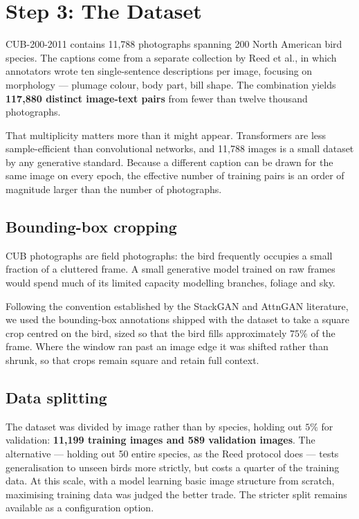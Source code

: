 \documentclass[11pt,a4paper]{article}
\newcommand{\step}[1]{\section{#1}}
\begin{document}
\step{Step 3: The Dataset}

CUB-200-2011 contains 11{,}788 photographs spanning 200 North American bird
species. The captions come from a separate collection by Reed et al., in which
annotators wrote ten single-sentence descriptions per image, focusing on
morphology --- plumage colour, body part, bill shape. The combination yields
\textbf{117{,}880 distinct image-text pairs} from fewer than twelve thousand
photographs.

That multiplicity matters more than it might appear. Transformers are less
sample-efficient than convolutional networks, and 11{,}788 images is a small
dataset by any generative standard. Because a different caption can be drawn for
the same image on every epoch, the effective number of training pairs is an
order of magnitude larger than the number of photographs.

\subsection{Bounding-box cropping}

CUB photographs are field photographs: the bird frequently occupies a small
fraction of a cluttered frame. A small generative model trained on raw frames
would spend much of its limited capacity modelling branches, foliage and sky.

Following the convention established by the StackGAN and AttnGAN literature, we
used the bounding-box annotations shipped with the dataset to take a square crop
centred on the bird, sized so that the bird fills approximately $75\%$ of the
frame. Where the window ran past an image edge it was shifted rather than shrunk,
so that crops remain square and retain full context.

\subsection{Data splitting}

The dataset was divided by image rather than by species, holding out $5\%$ for
validation: \textbf{11{,}199 training images and 589 validation images}. The
alternative --- holding out 50 entire species, as the Reed protocol does ---
tests generalisation to unseen birds more strictly, but costs a quarter of the
training data. At this scale, with a model learning basic image structure from
scratch, maximising training data was judged the better trade. The stricter
split remains available as a configuration option.
\end{document}
